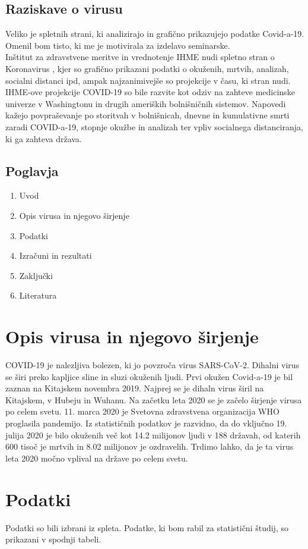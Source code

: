 \documentclass[a4paper,11pt]{article}
\begin{document}
\subsection{Raziskave o virusu}
Veliko je spletnih strani, ki analizirajo in grafično prikazujejo podatke Covid-a-19. Omenil bom tisto, ki me je motivirala za izdelavo seminarske. \\
Inštitut za zdravstvene meritve in vrednotenje IHME nudi spletno stran o Koronavirus \cite{cvd19IHME}, kjer so grafično prikazani podatki o okuženih, mrtvih, analizah, socialni distanci ipd, ampak najzanimivejše so projekcije v času, ki stran nudi. IHME-ove projekcije COVID-19 so bile razvite kot odziv na zahteve medicinske univerze v Washingtonu in drugih ameriških bolnišničnih sistemov. Napovedi kažejo povpraševanje po storitvah v bolnišnicah, dnevne in kumulativne smrti zaradi COVID-a-19, stopnje okužbe in analizah ter vpliv socialnega distanciranja, ki ga zahteva država.

\subsection{Poglavja}
\begin{enumerate}
\item{Uvod}
\item{Opis virusa in njegovo širjenje}
\item{Podatki}
\item{Izračuni in rezultati}
\item{Zaključki}
\item{Literatura}
\end{enumerate}

\section{Opis virusa in njegovo širjenje}
COVID-19 je nalezljiva bolezen, ki jo povzroča virus SARS-CoV-2. Dihalni virus se širi preko kapljice sline in sluzi okuženih ljudi. Prvi okužen Covid-a-19 je bil zaznan na Kitajskem novembra 2019. Najprej se je dihaln virus širil na Kitajskem, v Hubeju in Wuhanu. Na začetku leta 2020 se je začelo širjenje virusa po celem svetu. 11. marca 2020 je Svetovna zdravstvena organizacija WHO proglasila pandemijo. Iz statističnih podatkov je razvidno, da do vključno 19. julija 2020 je bilo okuženih več kot 14.2 milijonov ljudi v 188 državah, od katerih 600 tisoč je mrtvih in 8.02 milijonov je ozdravelih. Trdimo lahko, da je ta virus leta 2020 močno vplival na države po celem svetu.
\section{Podatki}
Podatki so bili izbrani iz spleta. Podatke, ki bom rabil za statistični študij, so prikazani v spodnji tabeli. \\
\end{document}
